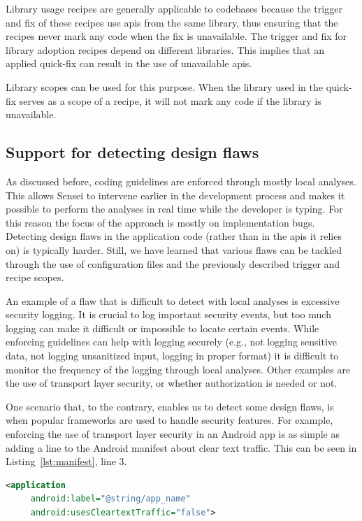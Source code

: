 Library usage recipes are generally applicable to codebases because the trigger and fix of these recipes use \glspl{api} from the same library, thus ensuring that the recipes never mark any code when the fix is unavailable.
The trigger and fix for library adoption recipes depend on different libraries.
This implies that an applied quick-fix can result in the use of unavailable \glspl{api}. 

Library scopes can be used for this purpose.
When the library used in the quick-fix serves as a scope of a recipe, it will not mark any code if the library is unavailable.

\subsection{Support for detecting design flaws}
As discussed before, coding guidelines are enforced through mostly local analyses.
This allows Sensei to intervene earlier in the development process and makes it possible to perform the analyses in real time while the developer is typing.
For this reason the focus of the approach is mostly on implementation bugs.
Detecting design flaws in the application code (rather than in the \glspl{api} it relies on) is typically harder.
Still, we have learned that various flaws can be tackled through the use of configuration files and the previously described trigger and recipe scopes.

An example of a flaw that is difficult to detect with local analyses is excessive security logging.
It is crucial to log important security events, but too much logging can make it difficult or impossible to locate certain events.
While enforcing guidelines can help with logging securely (e.g., not logging sensitive data, not logging unsanitized input, logging in proper format) it is difficult to monitor the frequency of the logging through local analyses.
Other examples are the use of transport layer security, or whether authorization is needed or not.

One scenario that, to the contrary, enables us to detect some design flaws, is when popular frameworks are used to handle security features.
For example, enforcing the use of transport layer security in an Android app is as simple as adding a line to the Android manifest about clear text traffic.
This can be seen in Listing~\ref{lst:manifest}, line 3.

\begin{lstlisting}[language={XML},caption={When the attribute \texttt{usesCleartextTraffic} is added to the Android manifest with value \texttt{false}, the Android \gls{os} will ensure that transport layer security is used for the communication with this application.},float,label={lst:manifest},abovecaptionskip=-0.5pt]
<application
     android:label="@string/app_name"
     android:usesCleartextTraffic="false">
\end{lstlisting}

